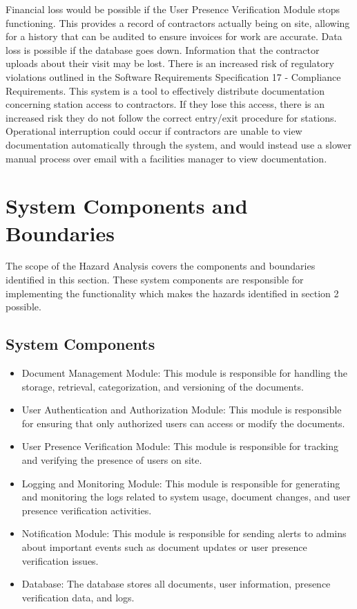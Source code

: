 \documentclass{article}
\begin{document}
Financial loss would be possible if the User Presence Verification Module stops functioning. This provides a record
of contractors actually being on site, allowing for a history that can be audited to ensure invoices for work are accurate.
Data loss is possible if the database goes down. Information that the contractor uploads about their visit may be lost.
There is an increased risk of regulatory violations outlined in the Software Requirements Specification 17 - Compliance Requirements.
This system is a tool to effectively distribute documentation concerning station access to contractors. If they lose this access, there
is an increased risk they do not follow the correct entry/exit procedure for stations.
Operational interruption could occur if contractors are unable to view documentation automatically through the system, and
would instead use a slower manual process over email with a facilities manager to view documentation.

\section{System Components and Boundaries}
The scope of the Hazard Analysis covers the components and boundaries identified in this section. These system components
are responsible for implementing the functionality which makes the hazards identified in section 2 possible.
\subsection{System Components}
\begin{itemize}
  \item Document Management Module: This module is responsible for handling the
    storage, retrieval, categorization, and versioning of the documents.
  \item User Authentication and Authorization Module: This module is responsible
    for ensuring that only authorized users can access or modify the
    documents.
  \item User Presence Verification Module: This module is responsible for
    tracking and verifying the presence of users on site.
  \item Logging and Monitoring Module: This module is responsible for generating
    and monitoring the logs related to system usage, document changes, and
    user presence verification activities.
  \item Notification Module: This module is responsible for sending alerts to
    admins about important events such as document updates or user presence
    verification issues.
  \item Database: The database stores all documents, user information, presence
    verification data, and logs.
\end{itemize}
\end{document}
